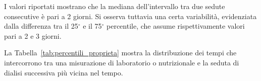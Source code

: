 \documentclass[a4paper,12pt]{report}
\begin{document}
I valori riportati mostrano che la mediana dell'intervallo tra due sedute consecutive è pari a 2 giorni. Si osserva tuttavia una certa variabilità, evidenziata dalla differenza tra il 25$^\circ$ e il 75$^\circ$ percentile, che assume rispettivamente valori pari a 2 e 3 giorni.

La Tabella~\ref{tab:percentili_proprieta} mostra la distribuzione dei tempi che intercorrono tra una misurazione di laboratorio o nutrizionale e la seduta di dialisi successiva più vicina nel tempo.

\begin{table}[H]
\centering
\caption{Distribuzione dei tempi tra misurazione e seduta di dialisi successiva, per proprietà}
\label{tab:percentili_proprieta}
\scriptsize
\setlength{\tabcolsep}{3pt}
\renewcommand{\arraystretch}{1.05}


\end{table}
\end{document}
